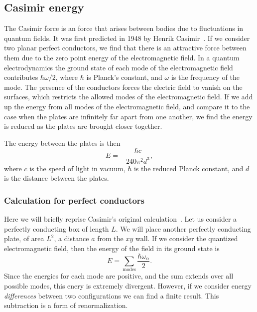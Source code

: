 \subsection{Casimir energy}

The Casimir force is an force that arises between bodies due to fluctuations in quantum fields.
  It was first predicted in 1948 by Henrik Casimir~\cite{Casimir1948}.
  If we consider two planar perfect conductors, we find that there is an 
attractive force between them due to the zero point energy of the electromagnetic field.
  In a quantum electrodynamics the ground state of each mode of the 
electromagnetic field contributes $\hbar\omega/2$, where $\hbar$ is Planck's
 constant, and $\omega$ is the frequency of the mode.
  The presence of the conductors forces the electric field to vanish on the surfaces,
 which restricts the allowed modes of the electromagnetic field.  
If we add up the energy from all modes of the electromagnetic field, 
and compare it to the case when the plates are infinitely far apart from one another, 
we find the energy is reduced as the plates are brought closer together.

  The energy between the plates is then
\begin{equation}
  E = -\frac{\hbar c}{240\pi^2 d^3},
\end{equation}
where $c$ is the speed of light in vacuum, $\hbar$ is the reduced Planck constant,
and $d$ is the distance between the plates.  

\subsubsection{Calculation for perfect conductors}

Here we will briefly reprise Casimir's original calculation~\cite{Casimir1948}.
  Let us consider a perfectly conducting box of length $L$.
  We will place another perfectly conducting plate, of area $L^2$, a distance $a$ from the $xy$ wall.   
If we consider the quantized electromagnetic field,  
then the energy of the field in its ground state is
\begin{equation}
E = \sum_{\text{modes}}\frac{\hbar\omega_\alpha}{2}.
\end{equation}
Since the energies for each mode are positive, and the sum extends over all possible modes,
 this enery is extremely divergent.
  However, if we consider energy \emph{differences} between two configurations 
we can find a finite result.  
This subtraction is a form of renormalization.  

